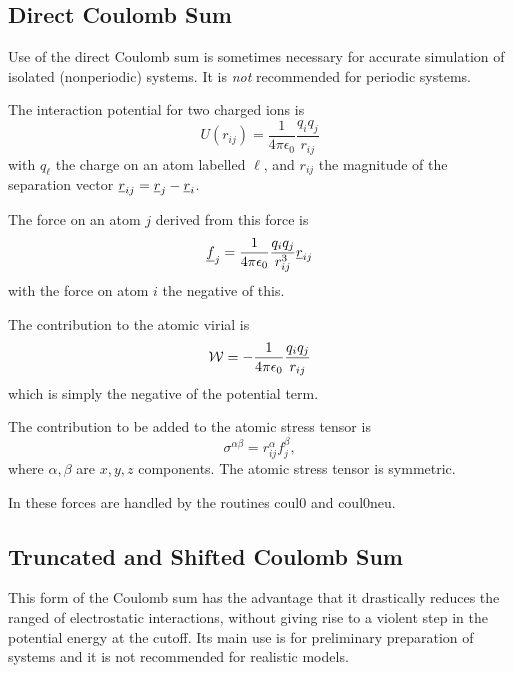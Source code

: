 \subsection{Direct Coulomb Sum}

Use of the direct Coulomb sum is sometimes necessary for accurate
simulation of isolated (nonperiodic) systems. It is {\em not}
recommended for periodic systems.

The interaction potential for two charged ions is
\begin{equation}
U(r_{ij})=\frac{1}{4\pi\epsilon_{0}}\frac{q_{i}q_{j}}{r_{ij}}
\end{equation}
with $q_{\ell}$ the charge on an atom labelled $\ell$, and $r_{ij}$
the magnitude of the separation vector
$\mbox{$\underline{r}$}_{ij}=\mbox{$\underline{r}$}_{j}-\mbox{$\underline{r}$}_{i}$.

The force on an atom $j$ derived from this force is
\begin{equation}
\mbox{$\underline{f}$}_{j}=\frac{1}{4\pi\epsilon_{0}}\frac{q_{i}q_{j}}{r_{ij}^{3}}\mbox{$\underline{r}$}_{ij}
\end{equation}
with the force on atom $i$ the negative of this.

The contribution to the atomic virial is
\begin{equation}
{\cal W}=-\frac{1}{4\pi\epsilon_{0}}\frac{q_{i}q_{j}}{r_{ij}}
\end{equation}
which is simply the negative of the potential term.

The contribution to be added to the atomic stress tensor is
\begin{equation}
\sigma^{\alpha \beta}=r_{ij}^{\alpha}f_{j}^{\beta},
\end{equation}
where $\alpha,\beta$ are $x,y,z$ components. The atomic stress tensor
is symmetric.

In \D{} these forces are handled by the routines {\sc coul0}
and {\sc coul0neu}.

\subsection{Truncated and Shifted Coulomb Sum}

This form of the Coulomb sum has the advantage that it drastically
reduces the ranged of electrostatic interactions, without giving rise
to a violent step in the potential energy at the cutoff. Its main use
is for preliminary preparation of systems and it is not recommended
for realistic models.

